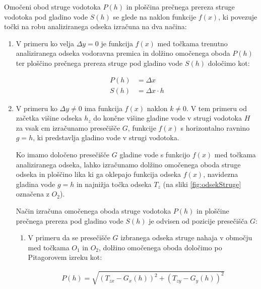 Omočeni obod struge vodotoka $P(h)$ in ploščina prečnega prereza struge vodotoka pod gladino vode $S(h)$ se glede na naklon funkcije $f(x)$, ki povezuje točki na robu analiziranega odseka izračuna na dva načina:

\begin{enumerate}

\item V primeru ko velja $\Delta y = 0$ je funkcija $f(x)$ med točkama trenutno analiziranega odseka vodoravna premica in dolžino omočenega oboda $P(h)$ ter ploščino prečnega prereza struge pod gladino vode $S(h)$ določimo kot:

\begin{ceqn}
\begin{align}
P(h)&= \Delta x\\
S(h)&= \Delta x \cdot h
\end{align}
\end{ceqn}


\item V primeru ko $\Delta y \neq 0$ ima funkcija $f(x)$ naklon $k \neq 0$. V tem primeru od začetka višine odseka $h_z$ do končne višine gladine vode v strugi vodotoka $H$ za vsak cm izračunamo presečišče $G$, funkcije $f(x)$ s horizontalno ravnino $g = h$, ki predstavlja gladino vode v strugi vodotoka. 


Ko imamo določeno presečišče $G$ gladine vode s funkcijo $f(x)$ med točkama analiziranega odseka, lahko izračunamo dolžino omočenega oboda struge odseka in ploščino lika ki ga oklepajo funkcija odseka $f(x)$, navidezna gladina vode $g = h$ in najnižja točka odseka $T_z$ (na sliki \ref{fig:odsekStruge} označena z $O_2$). 



Način izračuna omočenega oboda struge vodotoka $P(h)$ in ploščine prečnega prereza pod gladino vode $S(h)$ je odvisen od pozicije presečišča $G$:


\begin{enumerate}
	\item V primeru da se presečišče $G$ izbranega odseka struge nahaja v območju med točkama $O_1$ in $O_2$, dolžino omočenega oboda določimo po Pitagorovem izreku kot:
	
	\begin{ceqn}
		\begin{align}
		P(h) = \sqrt{(T_{zx} - G_x(h))^{2} + (T_{zy} - G_y(h))^{2}}
		\end{align}
	\end{ceqn}
	

\end{enumerate}
\end{enumerate}
